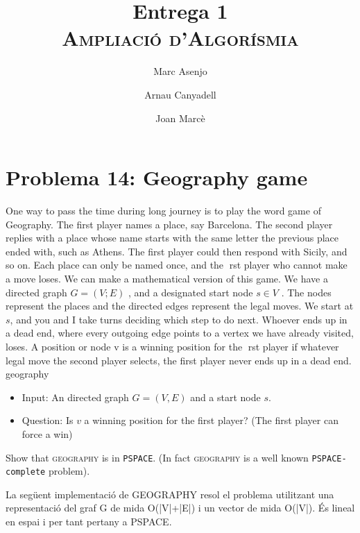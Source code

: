 \documentclass[a4paper]{article}
\title{Entrega 1 \\ \textsc{Ampliació d'Algorísmia}}
\author{Marc Asenjo \and Arnau Canyadell \and Joan Marcè}
\date{}
\begin{document}
\maketitle

\section{Problema 14: Geography game}


One way to pass the time during long journey is to play the word game
of Geography. The first player names a place, say Barcelona. The second player replies
with a place whose name starts with the same letter the previous place ended with, such as
Athens. The first player could then respond with Sicily, and so on. Each place can only be
named once, and the rst player who cannot make a move loses.
We can make a mathematical version of this game. We have a directed graph $G = (V;E)$ ,
and a designated start node $s \in V$ . The nodes represent the places and the directed edges
represent the legal moves. We start at $s$, and you and I take turns deciding which step to
do next. Whoever ends up in a dead end, where every outgoing edge points to a vertex we
have already visited, loses. A position or node v is a winning position for the rst player if
whatever legal move the second player selects, the first player never ends up in a dead end.
geography

\begin{itemize}
	\item Input: An directed graph $G = (V, E)$ and a start node $s$.
	\item Question: Is $v$ a winning position for the first player? (The first player can force a win)
\end{itemize}

Show that \textsc{geography} is in \texttt{PSPACE}. (In fact \textsc{geography} is a well known \texttt{PSPACE-complete}
problem).

La següent implementació de GEOGRAPHY resol el problema utilitzant una representació del graf G de mida O(|V|+|E|) i un vector de mida O(|V|). És lineal en espai i per tant pertany a PSPACE.
\end{document}
